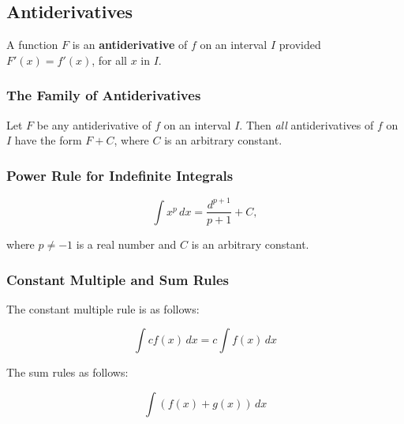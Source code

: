 %
%
%

\subsection{Antiderivatives}
A function $F$ is an \textbf{antiderivative} of $f$ on an interval $I$ provided $F'(x) = f'(x)$, for all $x$ in $I$.

\subsubsection{The Family of Antiderivatives}
Let $F$ be any antiderivative of $f$ on an interval $I$. Then \textit{all} antiderivatives of $f$ on $I$ have the form $F + C$, where $C$ is an arbitrary constant.

\subsubsection{Power Rule for Indefinite Integrals}
\begin{equation}
    \int x^p\, dx = \frac{d^{p + 1}}{p + 1} + C,
\end{equation}

where $p \neq -1$ is a real number and $C$ is an arbitrary constant.

\subsubsection{Constant Multiple and Sum Rules}
The constant multiple rule is as follows:

\begin{equation}
    \int c f(x)\, dx = c \int f(x)\, dx
\end{equation}

The sum rules as follows:

\begin{equation}
    \int (f(x) + g(x))\, dx
\end{equation}

